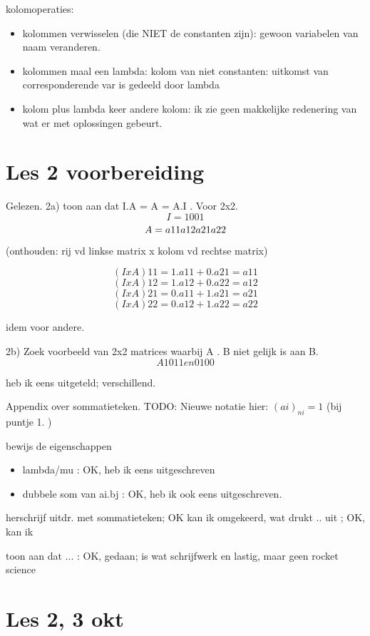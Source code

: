 \documentclass{article}
\begin{document}
kolomoperaties: 
\begin{itemize}
    \item kolommen verwisselen (die NIET de constanten zijn): gewoon variabelen van naam veranderen. 
    \item kolommen maal een lambda: 
kolom van niet constanten: uitkomst van corresponderende var is gedeeld door lambda
\item kolom plus lambda keer andere kolom: ik zie geen makkelijke redenering van wat er met oplossingen gebeurt. 

\end{itemize}



\section{Les 2 voorbereiding}

Gelezen. 
2a) toon aan dat I.A = A = A.I . Voor 2x2. 
\[I = 
1  0
0  1 \]
\[
A = 
a11  a12 \\
a21 a22\]

(onthouden: rij vd linkse matrix x kolom vd rechtse matrix) 

\[(I x A)11 = 1.a11 + 0.a21 =a11\]
\[(I x A)12 = 1.a12 + 0.a22 = a12\]
\[(I x A)21 = 0.a11 + 1.a21  =a21\]
\[(I x A)22 = 0.a12 + 1.a22 =a22\]


idem voor andere. 

2b) 
Zoek voorbeeld van 2x2 matrices waarbij A . B niet gelijk is aan B. 
\[A 
1  0
1  1 
en
0  1
0  0 \]

heb ik eens uitgeteld; verschillend. 


Appendix over sommatieteken. 
TODO: Nieuwe notatie hier: $(ai)_{ni}=1$  
(bij puntje 1. ) 

bewijs de eigenschappen
\begin{itemize}
\item lambda/mu : OK, heb ik eens uitgeschreven
\item dubbele som van ai.bj : OK, heb ik ook eens uitgeschreven. 
\end{itemize}


herschrijf uitdr. met sommatieteken; OK kan ik 
omgekeerd, wat drukt .. uit  ; OK, kan ik 

toon aan dat ... : OK, gedaan; is wat schrijfwerk en lastig, maar geen rocket science



\section{Les 2, 3 okt}
\end{document}
